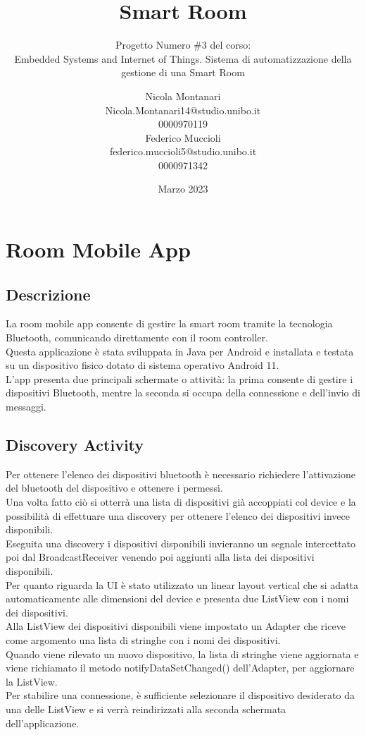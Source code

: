 \documentclass[a4paper]{report}
\title{\myfont Smart Room}
\subtitle{\huge Progetto Numero \#3 del corso: \\ Embedded Systems and Internet of Things. \vspace*{0.5cm} \newline Sistema di automatizzazione della gestione di una Smart Room}
\author{\LARGE Nicola Montanari \vspace*{0.5cm} \\ \vspace*{0.5cm} \LARGE Nicola.Montanari14@studio.unibo.it \\ \LARGE 0000970119 \vspace*{1cm} \\ \LARGE Federico Muccioli \vspace*{0.5cm} \\ \vspace*{0.5cm} \LARGE federico.muccioli5@studio.unibo.it \\ \LARGE 0000971342 \vspace*{1.5cm}}
\date{Marzo 2023}
\begin{document}
\sloppy
\maketitle
\Large\tableofcontents
\newpage

\chapter{Room Mobile App}
\section{Descrizione}
La room mobile app consente di gestire la smart room tramite la tecnologia Bluetooth, comunicando direttamente con il room controller. \\
Questa applicazione è stata sviluppata in Java per Android e installata e testata su un dispositivo fisico dotato di sistema operativo Android 11. \\
L'app presenta due principali schermate o attività: la prima consente di gestire i dispositivi Bluetooth, mentre la seconda si occupa della connessione e dell'invio di messaggi.


\newpage
\vspace*{-1cm}
\section{Discovery Activity}
Per ottenere l'elenco dei dispositivi bluetooth è necessario richiedere l'attivazione del bluetooth del dispositivo e ottenere i permessi. \\
Una volta fatto ciò si otterrà una lista di dispositivi già accoppiati col device e la possibilità di effettuare una discovery per ottenere l'elenco dei dispositivi invece disponibili. \\
Eseguita una discovery i dispositivi disponibili invieranno un segnale intercettato poi dal BroadcastReceiver venendo poi aggiunti alla lista dei dispositivi disponibili.\\
Per quanto riguarda la UI è stato utilizzato un linear layout vertical che si adatta automaticamente alle dimensioni del device e presenta due ListView con i nomi dei dispositivi.\\
Alla ListView dei dispositivi disponibili viene impostato un Adapter che riceve come argomento una lista di stringhe con i nomi dei dispositivi. \\
Quando viene rilevato un nuovo dispositivo, la lista di stringhe viene aggiornata e viene richiamato il metodo notifyDataSetChanged() dell'Adapter, per aggiornare la ListView.\\
Per stabilire una connessione, è sufficiente selezionare il dispositivo desiderato da una delle ListView e si verrà reindirizzati alla seconda schermata dell'applicazione.\\
\end{document}
